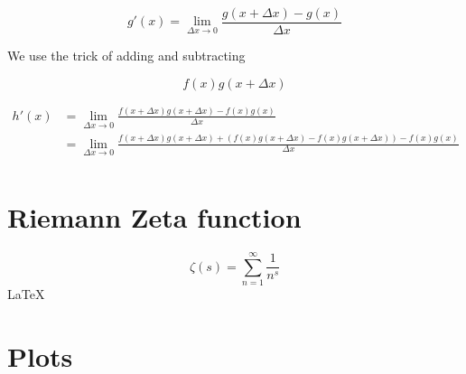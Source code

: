 \documentclass[11pt]{article}
\begin{document}
\begin{equation}
g\ensuremath{'}(x) = \lim_{\Delta{x} \to 0}\frac{g(x+\Delta {x}) - g(x)}{\Delta x}
\end{equation}

We use the trick of adding and subtracting

\begin{equation}
f(x)g(x+\Delta {x})
\end{equation}

\begin{equation}
\begin{split}
h\ensuremath{'}(x) &= \lim_{\Delta{x} \to 0}\frac{f(x+\Delta {x})g(x+\Delta {x}) - f(x)g(x)}{\Delta x} \\
                   &= \lim_{\Delta{x} \to 0}\frac{f(x+\Delta {x})g(x+\Delta {x}) + (f(x)g(x+\Delta {x}) - f(x)g(x+\Delta {x})) - f(x)g(x)}{\Delta x} \\
\end{split}
\end{equation}
\section{Riemann Zeta function}
\label{sec:org7ad6538}
\begin{equation}
\zeta(s) =\sum_{n=1}^\infty\frac{1}{n^s}
\end{equation}
\LaTeX

\section{Plots}
\label{sec:orgab8c9ae}
\begin{figure}[h]
\centering
{}
\end{figure}
\end{document}
